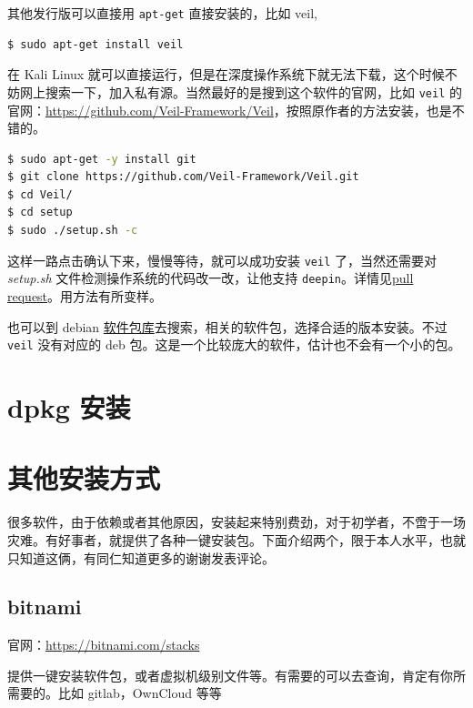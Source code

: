 \documentclass[doctor,openright,twoside]{sjtuthesis}
\newcommand{\passthrough}[1]{#1}
\theoremstyle{plain}
\theoremstyle{definition}
\theoremstyle{remark}
\theoremstyle{ocrenumbox}
\theoremstyle{plain}
\begin{document}
其他发行版可以直接用 \passthrough{\lstinline!apt-get!} 直接安装的，比如 veil,

\begin{lstlisting}[language=bash]
$ sudo apt-get install veil
\end{lstlisting}

在 Kali Linux 就可以直接运行，但是在深度操作系统下就无法下载，这个时候不妨网上搜索一下，加入私有源。当然最好的是搜到这个软件的官网，比如 \passthrough{\lstinline!veil!} 的官网：\url{https://github.com/Veil-Framework/Veil}，按照原作者的方法安装，也是不错的。

\begin{lstlisting}[language=bash]
$ sudo apt-get -y install git
$ git clone https://github.com/Veil-Framework/Veil.git
$ cd Veil/
$ cd setup
$ sudo ./setup.sh -c
\end{lstlisting}

这样一路点击确认下来，慢慢等待，就可以成功安装 \passthrough{\lstinline!veil!} 了，当然还需要对 \emph{setup.sh} 文件检测操作系统的代码改一改，让他支持 \passthrough{\lstinline!deepin!}。详情见\href{https://github.com/Veil-Framework/Veil/pull/130}{pull request}。用方法有所变样。

也可以到 debian \href{http://www.debian.org/distrib/packages}{软件包库}去搜索，相关的软件包，选择合适的版本安装。不过 \passthrough{\lstinline!veil!} 没有对应的 deb 包。这是一个比较庞大的软件，估计也不会有一个小的包。

\hypertarget{dpkg-}{%
\section{dpkg 安装}\label{dpkg-}}

\hypertarget{section-113}{%
\section{其他安装方式}\label{section-113}}

很多软件，由于依赖或者其他原因，安装起来特别费劲，对于初学者，不啻于一场灾难。有好事者，就提供了各种一键安装包。下面介绍两个，限于本人水平，也就只知道这俩，有同仁知道更多的谢谢发表评论。

\hypertarget{bitnami}{%
\subsection{bitnami}\label{bitnami}}

官网：\url{https://bitnami.com/stacks}

提供一键安装软件包，或者虚拟机级别文件等。有需要的可以去查询，肯定有你所需要的。比如 gitlab，OwnCloud 等等
\end{document}

